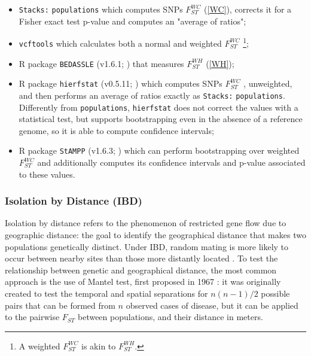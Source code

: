 \documentclass[a4paper, 12pt]{report}
\begin{document}
\begin{itemize}\setlength\itemsep{-0.2em}
	\item \texttt{Stacks:} \texttt{populations} which computes SNPs $F_{ST}^{WC}$ (\ref{WC}), corrects it for a Fisher exact test p-value and computes an "average of ratios"; 
	\item \texttt{vcftools} which calculates both a normal and weighted $F_{ST}^{WC}$   \footnote{A weighted $F_{ST}^{WC}$ is akin to $F_{ST}^{WH}$.};
	\item R package \texttt{BEDASSLE} (v1.6.1; \cite{bradburdBEDASSLEQuantifiesEffects2024}) that measures $F_{ST}^{WH}$  (\ref{WH});
	\item R package \texttt{hierfstat} (v0.5.11; \cite{goudetHierfstatEstimationTests2024}) which computes SNPs $F_{ST}^{WC}$ , unweighted, and then performs an average of ratios exactly as \texttt{Stacks:} \texttt{populations}. Differently from \texttt{populations}, \texttt{hierfstat} does not correct the values with a statistical test, but supports bootstrapping even in the absence of a reference genome, so it is able to compute confidence intervals;
	\item R package \texttt{StAMPP} (v1.6.3; \cite{pembletonStAMPPPackageCalculation2013}) which can perform bootstrapping over weighted $F_{ST}^{WC}$ and additionally computes its confidence intervals and p-value associated to these values.
\end{itemize}
\vspace{-1.5em}

\subsubsection{Isolation by Distance (IBD)}
Isolation by distance refers to the phenomenon of restricted gene flow due to geographic distance: the goal to identify the geographical distance that makes two populations genetically distinct. Under IBD, random mating is more likely to occur between nearby sites than those more distantly located \parencite{loaizaReviewGeneticDiversity2012}. To test the relationship between genetic and geographical distance, the most common approach is the use of Mantel test, first proposed in 1967 \parencite{mantelDetectionDiseaseClustering1967}: it was originally created to test the temporal and spatial separations for $n(n-1)/2$ possible pairs that can be formed from $n$ observed cases of disease, but it can be applied to the pairwise $F_{ST}$ between populations, and their distance in meters. 
\end{document}
